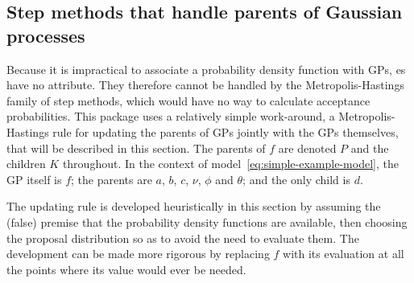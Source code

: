 \documentclass[article]{jss}
\begin{document}
\subsection{Step methods that handle parents of Gaussian processes}
Because it is impractical to associate a probability density function with GPs, es have no  attribute. They therefore cannot be handled by the Metropolis-Hastings family of step methods, which would have no way to calculate acceptance probabilities. This package uses a relatively simple work-around, a Metropolis-Hastings rule for updating the parents of GPs jointly with the GPs themselves, that will be described in this section. The parents of $f$ are denoted $P$ and the children $K$ throughout. In the context of model~\ref{eq:simple-example-model}, the GP itself is $f$; the parents are $a$, $b$, $c$, $\nu$, $\phi$ and $\theta$; and the only child is $d$.

The updating rule is developed heuristically in this section by assuming the (false) premise that the probability density functions are available, then choosing the proposal distribution so as to avoid the need to evaluate them. The development can be made more rigorous by replacing $f$ with its evaluation at all the points where its value would ever be needed.
\end{document}
